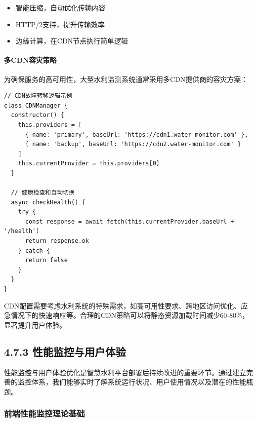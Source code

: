 
\begin{itemize}
\tightlist
\item
  智能压缩，自动优化传输内容
\item
  HTTP/2支持，提升传输效率
\item
  边缘计算，在CDN节点执行简单逻辑
\end{itemize}

\hypertarget{ux591acdnux5bb9ux707eux7b56ux7565}{%
\paragraph{多CDN容灾策略}\label{ux591acdnux5bb9ux707eux7b56ux7565}}

为确保服务的高可用性，大型水利监测系统通常采用多CDN提供商的容灾方案：

\begin{lstlisting}[style=javascript]
// CDN故障转移逻辑示例
class CDNManager {
  constructor() {
    this.providers = [
      { name: 'primary', baseUrl: 'https://cdn1.water-monitor.com' },
      { name: 'backup', baseUrl: 'https://cdn2.water-monitor.com' }
    ]
    this.currentProvider = this.providers[0]
  }
  
  // 健康检查和自动切换
  async checkHealth() {
    try {
      const response = await fetch(this.currentProvider.baseUrl + '/health')
      return response.ok
    } catch {
      return false
    }
  }
}
\end{lstlisting}

 CDN配置需要考虑水利系统的特殊需求，如高可用性要求、跨地区访问优化、应急情况下的快速响应等。合理的CDN策略可以将静态资源加载时间减少60-80\%，显著提升用户体验。

\hypertarget{ux6027ux80fdux76d1ux63a7ux4e0eux7528ux6237ux4f53ux9a8c}{%
\subsection{4.7.3 性能监控与用户体验}\label{ux6027ux80fdux76d1ux63a7ux4e0eux7528ux6237ux4f53ux9a8c}}

性能监控与用户体验优化是智慧水利平台部署后持续改进的重要环节。通过建立完善的监控体系，我们能够实时了解系统运行状况、用户使用情况以及潜在的性能瓶颈。

\hypertarget{ux524dux7aefux6027ux80fdux76d1ux63a7ux7406ux8bbaux57faux7840}{%
\subsubsection{前端性能监控理论基础}\label{ux524dux7aefux6027ux80fdux76d1ux63a7ux7406ux8bbaux57faux7840}}

